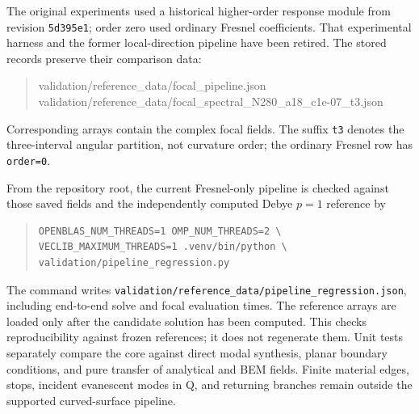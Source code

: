 \documentclass[11pt,a4paper]{article}
\numberwithin{equation}{section}
\begin{document}
The original experiments used a historical higher-order response module from
revision \texttt{5d395e1}; order zero used ordinary Fresnel coefficients.
That experimental harness and the former local-direction pipeline have been
retired. The stored records preserve their comparison data:
\begin{quote}\small\ttfamily
 validation/reference\_data/focal\_pipeline.json\\
 validation/reference\_data/focal\_spectral\_N280\_a18\_c1e-07\_t3.json
\end{quote}
Corresponding arrays contain the complex focal fields. The suffix
\texttt{t3} denotes the three-interval angular partition, not curvature order;
the ordinary Fresnel row has \texttt{order=0}.

From the repository root, the current Fresnel-only pipeline is checked against
those saved fields and the independently computed Debye $p=1$ reference by
\begin{quote}\small
\begin{verbatim}
OPENBLAS_NUM_THREADS=1 OMP_NUM_THREADS=2 \
VECLIB_MAXIMUM_THREADS=1 .venv/bin/python \
validation/pipeline_regression.py
\end{verbatim}
\end{quote}
The command writes \texttt{validation/reference\_data/pipeline\_regression.json},
including end-to-end solve and focal evaluation times. The reference arrays
are loaded only after the candidate solution has been computed. This checks
reproducibility against frozen references; it does not regenerate them.
Unit tests separately compare the core against direct modal synthesis,
planar boundary conditions, and pure transfer of analytical and BEM fields.
Finite material edges, stops, incident evanescent modes in Q, and returning
branches remain outside the supported curved-surface pipeline.
\end{document}
